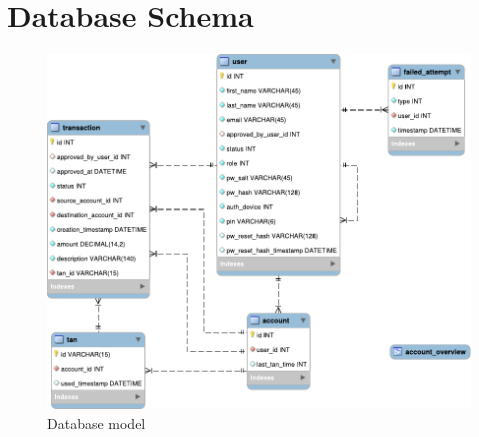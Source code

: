 \section{Database Schema}\label{section:db}
\begin{figure}[h!tbp]
	\centering
	\includegraphics[width=\textwidth]{figures/database_model}
	\caption{Database model}
	\label{figure:dbmodel}
\end{figure}

\clearpage

